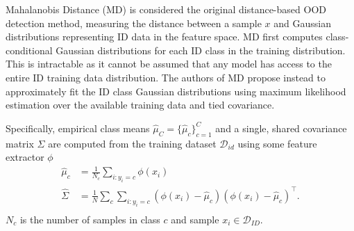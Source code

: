 Mahalanobis Distance (MD) \cite{lee2018simple} is considered the original distance-based OOD detection method, measuring the distance between a sample $x$ and Gaussian distributions representing ID data in the feature space. MD first computes class-conditional Gaussian distributions for each ID class in the training distribution. This is intractable as it cannot be assumed that any model has access to the entire ID training data distribution. The authors of MD propose instead to approximately fit the ID class Gaussian distributions using maximum likelihood estimation over the available training data and tied covariance.

Specifically, empirical class means $\hat{\mu}_{C} = \{\hat{\mu}_{c}\}_{c=1}^{C}$ and a single, shared covariance matrix $\hat{\Sigma}$ are computed from the training dataset $\mathcal{D}_{id}$ using some feature extractor $\phi$
\begin{equation}
\begin{aligned}
    \hat{\mu}_{c} & = \frac{1}{N_{c}} \sum_{i:y_{i}=c} \phi(x_{i}) \\
    \hat{\Sigma} & = \frac{1}{N} \sum_{c} \sum_{i:y_{i}=c} (\phi(x_{i}) - \hat{\mu}_{c}) (\phi(x_{i}) - \hat{\mu}_{c})^\top. \\
\end{aligned}
\end{equation}
$N_{c}$ is the number of samples in class $c$ and sample $x_{i} \in \mathcal{D}_{ID}$.

